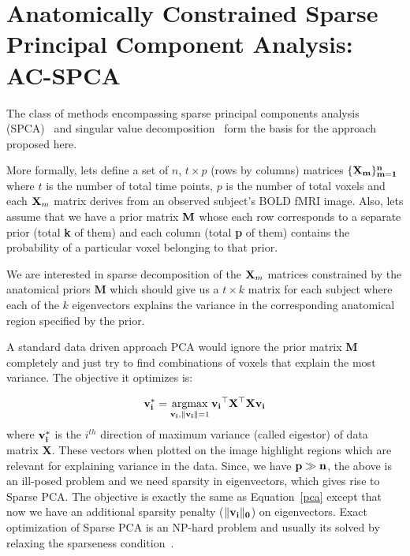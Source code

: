 \documentclass{article}
\newcommand{\argmax}{\operatornamewithlimits{argmax}}
\begin{document}





\section{ Anatomically Constrained Sparse Principal Component Analysis: AC-SPCA}
The class of methods encompassing sparse principal components analysis (SPCA)~\citep{zou2006sparse,Witten2009b,d2007direct} and singular value decomposition~\citep{sill2011robust} form the basis for the approach proposed here. 


More formally, lets define a set of $n$, $t\times p$ (rows by columns) matrices $\{\bf X_m\}_{m=1}^n$ where $t$ is the number of total time points, $p$ is the number of total voxels and each ${\bf X}_m$ matrix derives from an observed subject's BOLD fMRI image.
 Also, lets assume that we have a prior matrix {$\bf M$} whose each row corresponds to a separate prior (total {\bf k} of them) and each column (total {\bf p} of them) contains the probability of a particular voxel belonging to that prior. 


We are interested in sparse decomposition of the ${\bf X}_m$ matrices constrained by the anatomical priors {\bf M} which should give us a $t \times k$ matrix for each subject where each of the $k$ eigenvectors explains the variance in the corresponding anatomical region specified by the prior.


A standard data driven approach PCA would ignore the prior matrix {\bf M} completely and just try to find combinations of voxels that explain the most variance. The objective it optimizes is:

\begin{equation}
{\bf v_i^*}= \argmax_{{\bf v_i},{\bf \|v_i\|}=1} {\bf v_i}^{\top}{\bf X^{\top}X}{\bf v_i}
\label{pca}
\end{equation}
where {$\bf v_i^*$} is the $i^{th}$ direction of maximum variance (called eigestor) of data matrix {\bf X}. These vectors when plotted on the image highlight regions which are
relevant for explaining variance in the data. Since, we have ${\bf p \gg n}$, the above is an ill-posed problem and we need sparsity in eigenvectors, which gives rise to Sparse PCA. The objective is exactly the same as Equation~\ref{pca} except that now we have an additional sparsity penalty ($\|\bf v _i\|_0$) on eigenvectors.  Exact optimization of Sparse PCA is an NP-hard problem and usually its solved by relaxing the sparseness condition~\citep{zou2006sparse,Witten2009b}.
\end{document}
